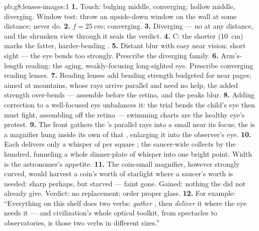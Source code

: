 \begin{solution}{pb:g8:lenses-images:1}
\textbf{1.} Touch: bulging middle, converging; hollow middle,
diverging. Window test:  throw an upside-down
window on the wall at some distance;  never
do.
\textbf{2.} $f = \qty{25}{cm}$; converging.
\textbf{3.} Diverging --- no  at any distance, and
the shrunken view through it seals the verdict.
\textbf{4.} C: the shorter  (\qty{10}{cm}) marks
the fatter, harder-bending .
\textbf{5.} Distant blur with easy near vision: short sight
--- the eye bends too strongly. Prescribe the diverging
family.
\textbf{6.} Arm's-length reading: the aging, weakly-focusing
long-sighted eye. Prescribe converging reading lenses.
\textbf{7.} Reading lenses add bending strength budgeted for
near pages; aimed at mountains, whose rays arrive parallel
and need no help, the added strength over-bends --- 
assemble before the retina, and the peaks blur.
\textbf{8.} Adding correction to a well-focused eye unbalances
it: the trial  bends  the child's eye then must
fight, assembling  off the retina --- swimming charts
are the healthy eye's protest.
\textbf{9.} The front  gathers the 's parallel rays
into a small  near its focus; the  is a
magnifier hung inside its own  of that ,
enlarging it into the observer's eye.
\textbf{10.} Each  delivers only a whisper of  per
square ; the saucer-wide  collects 
by the hundred, funneling a whole dinner-plate of whisper
into one bright point. Width is the astronomer's appetite.
\textbf{11.} The coin-small magnifier, however strongly
curved, would harvest a coin's worth of starlight where a
saucer's worth is needed:  sharp perhaps, but starved
--- faint  gone. Gained: nothing the  did not
already give. Verdict: no replacement; order proper glass.
\textbf{12.} For example: ``Everything on this shelf does two
verbs: \emph{gather} , then \emph{deliver} it where the
eye needs it --- and civilization's whole optical toolkit,
from spectacles to observatories, is those two verbs in
different sizes.''
\end{solution}
